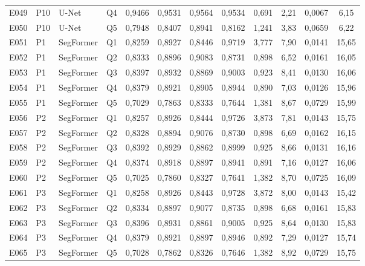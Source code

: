 \begin{longtable}{lllllccccccc}
E049 & P10 & U-Net & Q4 & 0{,}9466 & 0{,}9531 & 0{,}9564 & 0{,}9534 & 0{,}691 & 2{,}21 & 0{,}0067 & 6{,}15 \\
E050 & P10 & U-Net & Q5 & 0{,}7948 & 0{,}8407 & 0{,}8941 & 0{,}8162 & 1{,}241 & 3{,}83 & 0{,}0659 & 6{,}22 \\
E051 & P1 & SegFormer & Q1 & 0{,}8259 & 0{,}8927 & 0{,}8446 & 0{,}9719 & 3{,}777 & 7{,}90 & 0{,}0141 & 15{,}65 \\
E052 & P1 & SegFormer & Q2 & 0{,}8333 & 0{,}8896 & 0{,}9083 & 0{,}8731 & 0{,}898 & 6{,}52 & 0{,}0161 & 16{,}05 \\
E053 & P1 & SegFormer & Q3 & 0{,}8397 & 0{,}8932 & 0{,}8869 & 0{,}9003 & 0{,}923 & 8{,}41 & 0{,}0130 & 16{,}06 \\
E054 & P1 & SegFormer & Q4 & 0{,}8379 & 0{,}8921 & 0{,}8905 & 0{,}8944 & 0{,}890 & 7{,}03 & 0{,}0126 & 15{,}96 \\
E055 & P1 & SegFormer & Q5 & 0{,}7029 & 0{,}7863 & 0{,}8333 & 0{,}7644 & 1{,}381 & 8{,}67 & 0{,}0729 & 15{,}99 \\
E056 & P2 & SegFormer & Q1 & 0{,}8257 & 0{,}8926 & 0{,}8444 & 0{,}9726 & 3{,}873 & 7{,}81 & 0{,}0143 & 15{,}75 \\
E057 & P2 & SegFormer & Q2 & 0{,}8328 & 0{,}8894 & 0{,}9076 & 0{,}8730 & 0{,}898 & 6{,}69 & 0{,}0162 & 16{,}15 \\
E058 & P2 & SegFormer & Q3 & 0{,}8392 & 0{,}8929 & 0{,}8862 & 0{,}8999 & 0{,}925 & 8{,}66 & 0{,}0131 & 16{,}16 \\
E059 & P2 & SegFormer & Q4 & 0{,}8374 & 0{,}8918 & 0{,}8897 & 0{,}8941 & 0{,}891 & 7{,}16 & 0{,}0127 & 16{,}06 \\
E060 & P2 & SegFormer & Q5 & 0{,}7025 & 0{,}7860 & 0{,}8327 & 0{,}7641 & 1{,}382 & 8{,}70 & 0{,}0725 & 16{,}09 \\
E061 & P3 & SegFormer & Q1 & 0{,}8258 & 0{,}8926 & 0{,}8443 & 0{,}9728 & 3{,}872 & 8{,}00 & 0{,}0143 & 15{,}42 \\
E062 & P3 & SegFormer & Q2 & 0{,}8334 & 0{,}8897 & 0{,}9077 & 0{,}8735 & 0{,}898 & 6{,}68 & 0{,}0161 & 15{,}83 \\
E063 & P3 & SegFormer & Q3 & 0{,}8396 & 0{,}8931 & 0{,}8861 & 0{,}9005 & 0{,}925 & 8{,}64 & 0{,}0130 & 15{,}83 \\
E064 & P3 & SegFormer & Q4 & 0{,}8379 & 0{,}8921 & 0{,}8897 & 0{,}8946 & 0{,}892 & 7{,}29 & 0{,}0127 & 15{,}74 \\
E065 & P3 & SegFormer & Q5 & 0{,}7028 & 0{,}7862 & 0{,}8326 & 0{,}7646 & 1{,}382 & 8{,}92 & 0{,}0729 & 15{,}75 \\

\end{longtable}
